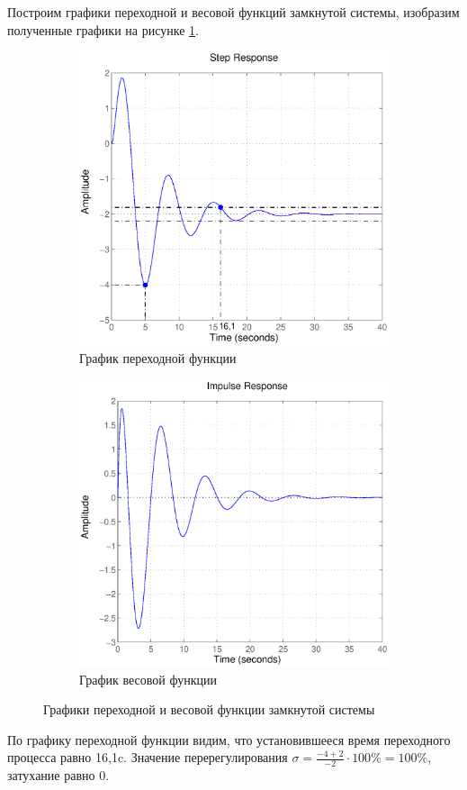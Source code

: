 \documentclass[12pt,a4paper]{article}
\begin{document}
Построим графики переходной и весовой функций замкнутой системы, изобразим полученные графики на рисунке \ref{stepimpulse}.
\begin{figure}[H]
	\centering
	\begin{subfigure}[b]{0.48\textwidth}
	    \includegraphics[width = \textwidth]{step}
		\caption{График переходной функции}
	\end{subfigure}
	\hfill
	\begin{subfigure}[b]{0.48\textwidth}
		\includegraphics[width = \textwidth]{impulse}
		\caption{График весовой функции}
	\end{subfigure}
	\caption{Графики переходной и весовой функции замкнутой системы}
	\label{stepimpulse}
\end{figure}
По графику переходной функции видим, что установившееся время переходного процесса равно 16,1c. Значение перерегулирования $\sigma=\displaystyle{\frac{-4+2}{-2}\cdot100\%=100\%}$, затухание равно 0.
\end{document}

